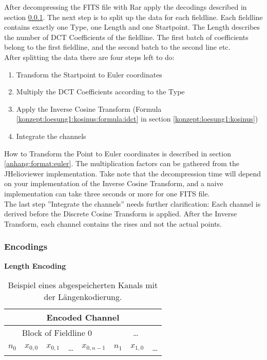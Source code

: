 After decompressing the FITS file with Rar apply the decodings described in section \ref{anhang:format:encodings}. The next step is to split up the data for each fieldline. Each fieldline contains exactly one Type, one Length and one Startpoint. The Length describes the number of DCT Coefficients of the fieldline. The first batch of coefficients belong to the first fieldline, and the second batch to the second line etc.\\
After splitting the data there are four steps left to do: 
\begin{enumerate}
	\item Transform the Startpoint to Euler coordinates
	\item Multiply the DCT Coefficients according to the Type
	\item Apply the Inverse Cosine Transform (Formula \eqref{konzept:loesung1:kosinus:formula:idct} in section \ref{konzept:loesung1:kosinus})
	\item Integrate the channels
\end{enumerate}
How to Transform the Point to Euler coordinates is described in section \ref{anhang:format:euler}. The multiplication factors can be gathered from the JHelioviewer implementation. Take note that the decompression time will depend on your implementation of the Inverse Cosine Transform, and a naive implementation can take three seconds or more for one FITS file.\\
The last step ''Integrate the channels'' needs further clarification: Each channel is derived before the Discrete Cosine Transform is applied. After the Inverse Transform, each channel contains the rises and not the actual points.

\subsubsection{Encodings} \label{anhang:format:encodings}

\textbf{Length Encoding}\\
\begin{table}[!htbp]
	\center
	\begin{tabular}{||c|c|c|c|c||c|c|c}
		\hline
		\multicolumn{8}{|c|}{Encoded Channel}\\\hline\hline
		 \multicolumn{5}{||c||}{Block of Fieldline 0} & \multicolumn{3}{c}{\ldots} \\\hline
		$n_0$ &$x_{0,0}$ &$x_{0,1}$ & \ldots & $x_{0,n-1}$ & $n_1$ & $x_{1,0}$ & \ldots\\\hline
	\end{tabular}
	\caption{Beispiel eines abgespeicherten Kanals mit der Längenkodierung.}
	\label{anhang:format:encodings:laengenkodierung}
\end{table}

